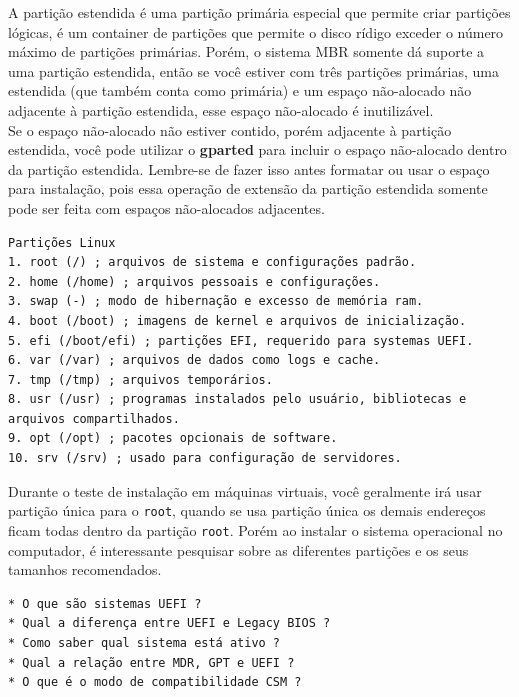 \documentclass[12pt,a4paper]{article}
\begin{document}
A partição estendida é uma partição primária especial que permite criar partições lógicas, é um container de partições que permite o disco rídigo exceder o número máximo de partições primárias. Porém, o sistema MBR somente dá suporte a uma partição estendida, então se você estiver com três partições primárias, uma estendida (que também conta como primária) e um espaço não-alocado não adjacente à partição estendida, esse espaço não-alocado é inutilizável. \\

Se o espaço não-alocado não estiver contido, porém adjacente à partição estendida, você pode utilizar o \textbf{gparted} para incluir o espaço não-alocado dentro da partição estendida. Lembre-se de fazer isso antes formatar ou usar o espaço para instalação, pois essa operação de extensão da partição estendida somente pode ser feita com espaços não-alocados adjacentes. \\ 

\begin{lstlisting} 
Partições Linux
1. root (/) ; arquivos de sistema e configurações padrão.
2. home (/home) ; arquivos pessoais e configurações.
3. swap (-) ; modo de hibernação e excesso de memória ram.
4. boot (/boot) ; imagens de kernel e arquivos de inicialização.
5. efi (/boot/efi) ; partições EFI, requerido para systemas UEFI.
6. var (/var) ; arquivos de dados como logs e cache.
7. tmp (/tmp) ; arquivos temporários.
8. usr (/usr) ; programas instalados pelo usuário, bibliotecas e arquivos compartilhados.
9. opt (/opt) ; pacotes opcionais de software.
10. srv (/srv) ; usado para configuração de servidores.
\end{lstlisting}

\vspace{\baselineskip}

Durante o teste de instalação em máquinas virtuais, você geralmente irá usar partição única para o \texttt{root}, quando se usa partição única os demais endereços ficam todas dentro da partição \texttt{root}. Porém ao instalar o sistema operacional no computador, é interessante pesquisar sobre as diferentes partições e os seus tamanhos recomendados.\\

\begin{lstlisting}
* O que são sistemas UEFI ?
* Qual a diferença entre UEFI e Legacy BIOS ?
* Como saber qual sistema está ativo ? 
* Qual a relação entre MDR, GPT e UEFI ? 
* O que é o modo de compatibilidade CSM ?
\end{lstlisting}
\end{document}
